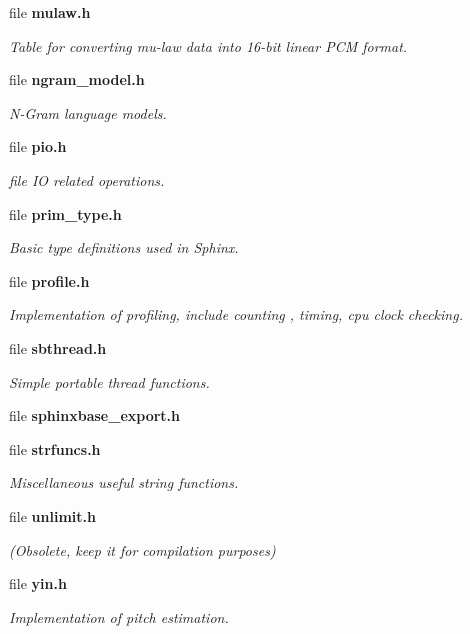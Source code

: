 \begin{DoxyCompactItemize}
file {\bf mulaw.\-h}
\begin{DoxyCompactList}\small\item\em Table for converting mu-\/law data into 16-\/bit linear P\-C\-M format. \end{DoxyCompactList}\item 
file {\bf ngram\-\_\-model.\-h}
\begin{DoxyCompactList}\small\item\em N-\/\-Gram language models. \end{DoxyCompactList}\item 
file {\bf pio.\-h}
\begin{DoxyCompactList}\small\item\em file I\-O related operations. \end{DoxyCompactList}\item 
file {\bf prim\-\_\-type.\-h}
\begin{DoxyCompactList}\small\item\em Basic type definitions used in Sphinx. \end{DoxyCompactList}\item 
file {\bf profile.\-h}
\begin{DoxyCompactList}\small\item\em Implementation of profiling, include counting , timing, cpu clock checking. \end{DoxyCompactList}\item 
file {\bf sbthread.\-h}
\begin{DoxyCompactList}\small\item\em Simple portable thread functions. \end{DoxyCompactList}\item 
file {\bfseries sphinxbase\-\_\-export.\-h}
\item 
file {\bf strfuncs.\-h}
\begin{DoxyCompactList}\small\item\em Miscellaneous useful string functions. \end{DoxyCompactList}\item 
file {\bf unlimit.\-h}
\begin{DoxyCompactList}\small\item\em (Obsolete, keep it for compilation purposes) \end{DoxyCompactList}\item 
file {\bf yin.\-h}
\begin{DoxyCompactList}\small\item\em Implementation of pitch estimation. \end{DoxyCompactList}\end{DoxyCompactItemize}
